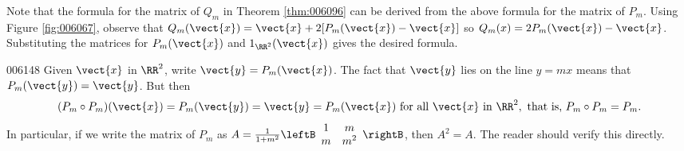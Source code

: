 Note that the formula for the matrix of $Q_{m}$ in Theorem \ref{thm:006096} can be derived from the above formula for the matrix of $P_m$. Using Figure \ref{fig:006067}, observe that $Q_{m}(\vect{x}) = \vect{x} + 2[P_{m}(\vect{x}) - \vect{x}]$ so $Q_{m}(x) = 2P_{m}(\vect{x})-\vect{x}$. Substituting the matrices for $P_{m}(\vect{x})$ and $1_{\RR^2}(\vect{x})$ gives the desired formula. 

\begin{example}{}{006148}
Given $\vect{x}$ in $\RR^2$, write $\vect{y} = P_{m}(\vect{x})$. The fact that $\vect{y}$ lies on the line $y = mx$ means that $P_{m}(\vect{y}) = \vect{y}$. But then
\begin{equation*}
(P_{m} \circ P_{m})(\vect{x}) = P_{m}(\vect{y}) = \vect{y} = P_{m}(\vect{x}) \mbox{ for all } \vect{x} \mbox{ in } \RR^2, \mbox{ that is, } P_{m} \circ P_{m} = P_{m}.
\end{equation*}
In particular, if we write the matrix of $P_{m}$ as $A = \frac{1}{1 + m^2} \leftB \begin{array}{cc}
1 & m \\
m & m^2
\end{array} \rightB$, then $A^{2} = A$. The reader should verify this directly.
\end{example}
